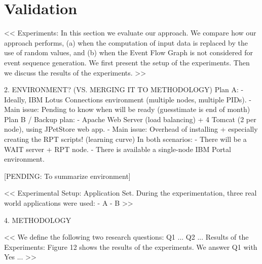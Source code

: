 \documentclass[runningheads,a4paper]{llncs}
\begin{document}

\section{Validation}

<<
Experiments: In this section we evaluate our approach. We compare how our approach performs,
(a) when the computation of input data is replaced by the use of random
values, and (b) when the Event Flow Graph is not considered for event sequence
generation. We first present the setup of the experiments. Then we discuss the
results of the experiments.
>>

2.	ENVIRONMENT? (VS. MERGING IT TO METHODOLOGY)
Plan A:
- Ideally, IBM Lotus Connections environment (multiple nodes, multiple PIDs).
- Main issue: Pending to know when will be ready (guesstimate is end of month)
Plan B / Backup plan: 
- Apache Web Server (load balancing) + 4 Tomcat (2 per node), using JPetStore
web app.
- Main issue: Overhead of installing + especially creating the RPT scripts!
(learning curve) In both scenarios:
- There will be a WAIT server + RPT node.
- There is available a single-node IBM Portal environment.

[PENDING: To summarize environment]

<<
Experimental Setup: Application Set. During the experimentation, three real world applications
were used:
- A
- B
>>

4.	METHODOLOGY

<<
We define the following two research questions: Q1 ... Q2 ...
Results of the Experiments: Figure 12 shows the results of the experiments. We answer Q1 with Yes ...
>>
\end{document}
